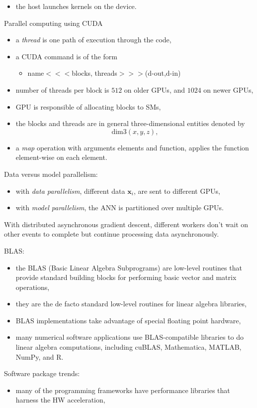 \documentclass[onecolumn]{IEEEtran}
\newcommand{\beq}{\begin{equation}}
\newcommand{\eeq}{\end{equation}}
\newcommand{\bi}{\begin{itemize}}
\newcommand{\ei}{\end{itemize}}
\begin{document}
\begin{itemize}
        \item the host launches kernels on the device.
    \ei
    \item Parallel computing using CUDA
    \bi
        \item a \emph{thread} is one path of execution through the code,
        \item a CUDA command is of the form
        \bi
            \item name$<<<$blocks, threads$>>>$(d-out,d-in)
        \ei
        \item number of threads per block is $512$ on older GPUs, and $1024$ on newer GPUs,
        \item GPU is responsible of allocating blocks to SMs,
        \item the blocks and threads are in general three-dimensional entities denoted by
        \beq
            \text{dim}3(x,y,z),
        \eeq
        \item a \emph{map} operation with arguments elements and function, applies the function element-wise on each element.
    \ei
    \item Data versus model parallelism:
    \bi
        \item with \emph{data parallelism}, different data $\bm{x}_i$, are sent to different GPUs,
        \item with \emph{model parallelism}, the ANN is partitioned over multiple GPUs.
    \ei
    \item With distributed asynchronous gradient descent, different workers don't wait on other events to complete but continue processing data asynchronously.
    \item BLAS:
    \bi
        \item the BLAS (Basic Linear Algebra Subprograms) are low-level routines that provide standard building blocks for performing basic vector and matrix operations,
        \item they are the de facto standard low-level routines for linear algebra libraries,
        \item BLAS implementations take advantage of special floating point hardware,
        \item many numerical software applications use BLAS-compatible libraries to do linear algebra computations, including cuBLAS, Mathematica, MATLAB, NumPy, and R.
    \ei
    \item Software package trends:
    \bi
        \item many of the programming frameworks have performance libraries that harness the HW acceleration,

\end{itemize}
\end{document}
